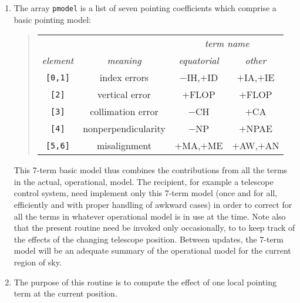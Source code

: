 \documentclass[12pt,fleqn,twoside]{article}
\renewcommand{\_}{{\tt\char'137}}     %
\begin{document}
{\begin{enumerate}
      is being applied.
\item The array {\tt pmodel} is a list of seven pointing coefficients
      which comprise a basic pointing model:
      \begin{quote}
      \begin{tabular}{cccc}
      & & \multicolumn{2}{c}{\it term name} \\
      {\it element} & {\it meaning} & {\it equatorial} & {\it other} \\[1ex]
      {\tt [0,1]} & index errors & $-$IH,$+$ID & $+$IA,$+$IE \\
      {\tt [2]} & vertical error & $+$FLOP & $+$FLOP \\
      {\tt [3]} & collimation error & $-$CH & $+$CA \\
      {\tt [4]} & nonperpendicularity & $-$NP & $+$NPAE \\
      {\tt [5,6]} & misalignment & $+$MA,$+$ME & $+$AW,$+$AN \\
      \end{tabular}
      \end{quote}
      This 7-term basic model thus combines the contributions from all
      the terms in the actual, operational, model.  The recipient, for
      example a telescope control system, need implement only this
      7-term model (once and for all, efficiently and with proper
      handling of awkward cases) in order to correct for all the terms
      in whatever operational model is in use at the time.  Note also
      that the present routine need be invoked only occasionally, to
      to keep track of the effects of the changing telescope position.
      Between updates, the 7-term model will be an adequate summary of
      the operational model for the current region of sky.
\item The purpose of this routine is to compute the effect of
      one local pointing term at the current position.


\end{enumerate}}
\end{document}
